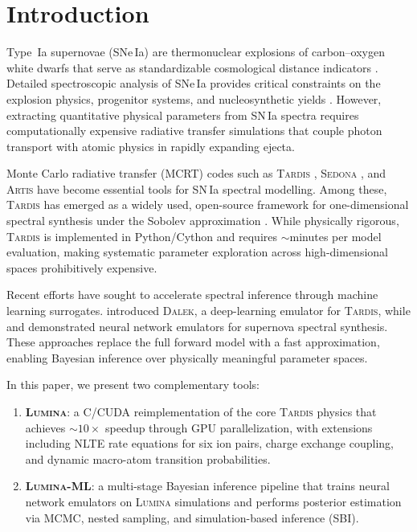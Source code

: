 \documentclass[fleqn,usenatbib]{mnras}
\newcommand{\lumina}{\textsc{Lumina}}
\newcommand{\luminaml}{\textsc{Lumina-ML}}
\newcommand{\tardis}{\textsc{Tardis}}
\begin{document}
\section{Introduction}
\label{sec:intro}

Type~Ia supernovae (SNe\,Ia) are thermonuclear explosions of carbon--oxygen white dwarfs that serve as standardizable cosmological distance indicators \citep{phillips1993,riess1998,perlmutter1999}. Detailed spectroscopic analysis of SNe\,Ia provides critical constraints on the explosion physics, progenitor systems, and nucleosynthetic yields \citep{nomoto1984,branch2006}. However, extracting quantitative physical parameters from SN\,Ia spectra requires computationally expensive radiative transfer simulations that couple photon transport with atomic physics in rapidly expanding ejecta.

Monte Carlo radiative transfer (MCRT) codes such as \tardis{} \citep{tardis2014}, \textsc{Sedona} \citep{kasen2006}, and \textsc{Artis} \citep{sim2007} have become essential tools for SN\,Ia spectral modelling. Among these, \tardis{} has emerged as a widely used, open-source framework for one-dimensional spectral synthesis under the Sobolev approximation \citep{sobolev1960}. While physically rigorous, \tardis{} is implemented in Python/Cython and requires ${\sim}$minutes per model evaluation, making systematic parameter exploration across high-dimensional spaces prohibitively expensive.

Recent efforts have sought to accelerate spectral inference through machine learning surrogates. \citet{kerzendorf2018} introduced \textsc{Dalek}, a deep-learning emulator for \tardis{}, while \citet{obrien2021} and \citet{vogl2020} demonstrated neural network emulators for supernova spectral synthesis. These approaches replace the full forward model with a fast approximation, enabling Bayesian inference over physically meaningful parameter spaces.

In this paper, we present two complementary tools:

\begin{enumerate}
    \item \textbf{\lumina{}}: a C/CUDA reimplementation of the core \tardis{} physics that achieves ${\sim}10\times$ speedup through GPU parallelization, with extensions including NLTE rate equations for six ion pairs, charge exchange coupling, and dynamic macro-atom transition probabilities.
    \item \textbf{\luminaml{}}: a multi-stage Bayesian inference pipeline that trains neural network emulators on \lumina{} simulations and performs posterior estimation via MCMC, nested sampling, and simulation-based inference (SBI).
\end{enumerate}
\end{document}

